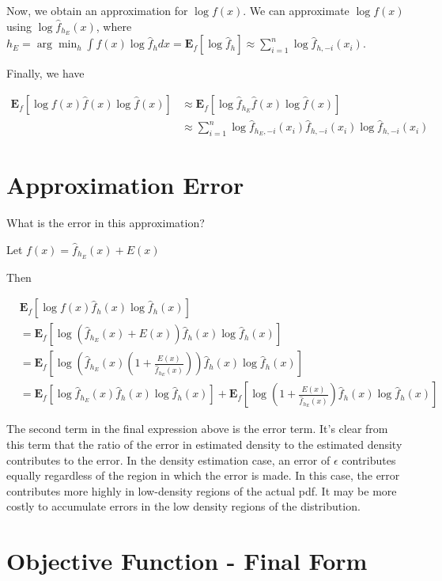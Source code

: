\documentclass{amsart}
\begin{document}
Now, we obtain an approximation for $ \log f(x) $. We can approximate $ \log f(x) $ using $ \log \hat{f}_{h_E}(x) $, where $ h_E = \arg \min_h \int f(x) \log \hat{f}_h dx = \mathbf{E}_f[\log \hat{f}_h] \approx \sum_{i=1}^n \log \hat{f}_{h,-i}(x_i) $.



Finally, we have

\begin{align*}
\mathbf{E}_{f}[\log f(x) \hat{f}(x) \log \hat{f}(x)] & \approx \mathbf{E}_f[ \log \hat{f}_{h_E} \hat{f}(x) \log \hat{f}(x)]\\
& \approx \sum_{i=1}^n \log \hat{f}_{h_E,-i}(x_i) \hat{f}_{h,-i}(x_i) \log \hat{f}_{h,-i}(x_i)
\end{align*}

\section{Approximation Error}

What is the error in this approximation?

Let $ f(x) = \hat{f}_{h_E}(x) + E(x) $

Then

\begin{align*}
& \mathbf{E}_f[ \log f(x) \hat{f}_h(x) \log \hat{f}_h(x)]\\
& = \mathbf{E}_f[ \log (\hat{f}_{h_E}(x) + E(x)) \hat{f}_h(x) \log \hat{f}_h(x)]\\
& = \mathbf{E}_f[ \log (\hat{f}_{h_E}(x) (1 + \frac{E(x)}{\hat{f}_{h_E}(x)})) \hat{f}_h(x) \log \hat{f}_h(x)]\\
& = \mathbf{E}_f[ \log \hat{f}_{h_E}(x) \hat{f}_h(x) \log \hat{f}_h(x)] + \mathbf{E}_f[ \log (1 + \frac{E(x)}{\hat{f}_{h_E}(x)}) \hat{f}_h(x) \log \hat{f}_h(x)]
\end{align*}

The second term in the final expression above is the error term. It's clear from this term that the ratio of the error in estimated density to the estimated density contributes to the error. In the density estimation case, an error of $ \epsilon $ contributes equally regardless of the region in which the error is made. In this case, the error contributes more highly in low-density regions of the actual pdf. It may be more costly to accumulate errors in the low density regions of the distribution.


\section{Objective Function - Final Form}
\end{document}
